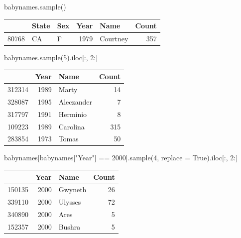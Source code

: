 \documentclass[
  letterpaper,
  DIV=11,
  numbers=noendperiod]{scrreprt}
\newenvironment{Shaded}{\begin{snugshade}}{\end{snugshade}}
\newcommand{\DecValTok}[1]{\textcolor[rgb]{0.68,0.00,0.00}{#1}}
\newcommand{\NormalTok}[1]{\textcolor[rgb]{0.00,0.23,0.31}{#1}}
\newcommand{\OperatorTok}[1]{\textcolor[rgb]{0.37,0.37,0.37}{#1}}
\newcommand{\StringTok}[1]{\textcolor[rgb]{0.13,0.47,0.30}{#1}}
\newcommand{\VariableTok}[1]{\textcolor[rgb]{0.07,0.07,0.07}{#1}}
\begin{document}
\begin{Shaded}
\begin{Highlighting}[]
\NormalTok{babynames.sample()}
\end{Highlighting}
\end{Shaded}

\begin{tabular}{lllrlr}
\toprule
{} & State & Sex &  Year &      Name &  Count \\
\midrule
80768 &    CA &   F &  1979 &  Courtney &    357 \\
\bottomrule
\end{tabular}

\begin{Shaded}
\begin{Highlighting}[]
\NormalTok{babynames.sample(}\DecValTok{5}\NormalTok{).iloc[:, }\DecValTok{2}\NormalTok{:]}
\end{Highlighting}
\end{Shaded}

\begin{tabular}{lrlr}
\toprule
{} &  Year &        Name &  Count \\
\midrule
312314 &  1989 &       Marty &     14 \\
328087 &  1995 &  Aleczander &      7 \\
317797 &  1991 &    Herminio &      8 \\
109223 &  1989 &    Carolina &    315 \\
283854 &  1973 &       Tomas &     50 \\
\bottomrule
\end{tabular}

\begin{Shaded}
\begin{Highlighting}[]
\NormalTok{babynames[babynames[}\StringTok{"Year"}\NormalTok{] }\OperatorTok{==} \DecValTok{2000}\NormalTok{].sample(}\DecValTok{4}\NormalTok{, replace }\OperatorTok{=} \VariableTok{True}\NormalTok{).iloc[:, }\DecValTok{2}\NormalTok{:]}
\end{Highlighting}
\end{Shaded}

\begin{tabular}{lrlr}
\toprule
{} &  Year &     Name &  Count \\
\midrule
150135 &  2000 &  Gwyneth &     26 \\
339110 &  2000 &  Ulysses &     72 \\
340890 &  2000 &     Ares &      5 \\
152357 &  2000 &   Bushra &      5 \\
\bottomrule
\end{tabular}
\end{document}
